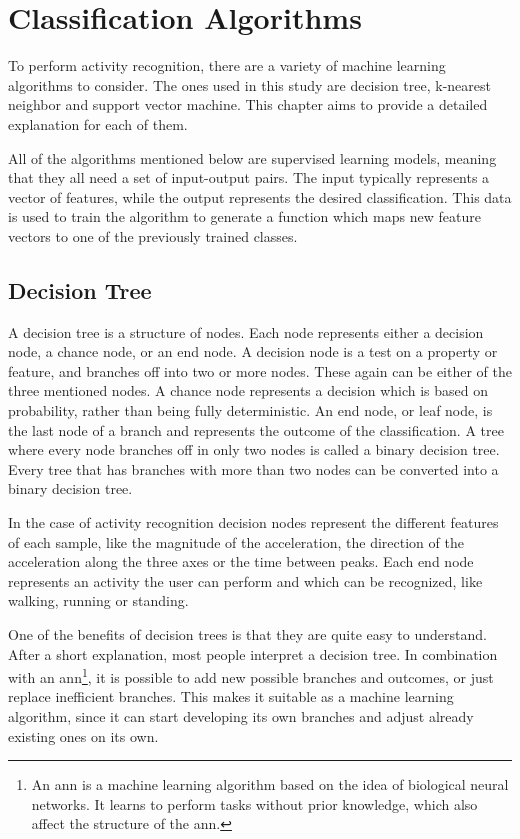 \section{Classification Algorithms}
\label{section:classification}

To perform activity recognition, there are a variety of machine learning algorithms to consider. The ones used in this study are decision tree, k-nearest neighbor and support vector machine. This chapter aims to provide a detailed explanation for each of them.

All of the algorithms mentioned below are supervised learning models, meaning that they all need a set of input-output pairs. The input typically represents a vector of features, while the output represents the desired classification. This data is used to train the algorithm to generate a function which maps new feature vectors to one of the previously trained classes.


\subsection{Decision Tree}
A decision tree is a structure of nodes. Each node represents either a decision node, a chance node, or an end node. A decision node is a test on a property or feature, and branches off into two or more nodes. These again can be either of the three mentioned nodes. A chance node represents a decision which is based on probability, rather than being fully deterministic. An end node, or leaf node, is the last node of a branch and represents the outcome of the classification. A tree where every node branches off in only two nodes is called a binary decision tree. Every tree that has branches with more than two nodes can be converted into a binary decision tree.

In the case of activity recognition decision nodes represent the different features of each sample, like the magnitude of the acceleration, the direction of the acceleration along the three axes or the time between peaks. Each end node represents an activity the user can perform and which can be recognized, like walking, running or standing.

One of the benefits of decision trees is that they are quite easy to understand. After a short explanation, most people interpret a decision tree. In combination with an \gls{ann}\footnote{An \gls{ann} is a machine learning algorithm based on the idea of biological neural networks. It learns to perform tasks without prior knowledge, which also affect the structure of the \gls{ann}.}, it is possible to add new possible branches and outcomes, or just replace inefficient branches. This makes it suitable as a machine learning algorithm, since it can start developing its own branches and adjust already existing ones on its own.

